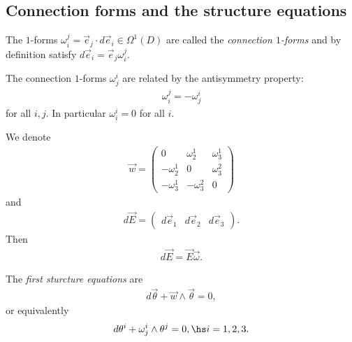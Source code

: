 \documentclass{article}
\begin{document}
\subsection{Connection forms and the structure equations}

\begin{definition}
    The $1$-forms $\omega_i^j=\vec e_j\cdot d\vec e_i\in\Omega^1(D)$ are called the 
    \emph{connection $1$-forms} and by definition satisfy $d\vec e_i = \vec e_j\omega_i^j$.
\end{definition}

\begin{proposition}
    The connection $1$-forms $\omega_j^i$ are related by the antisymmetry property: 
    \begin{align*}
        \omega_i^j = -\omega_j^i
    \end{align*}
    for all $i,j$. In particular $\omega_i^i = 0$ for all $i$.
\end{proposition}

\begin{lemma}
    We denote 
    \begin{align*}
        \vec w = \begin{pmatrix}
            0           & \omega_2^1  & \omega_3^1 \\
            -\omega_2^1 & 0           & \omega_3^2 \\
            -\omega_3^1 & -\omega_3^2 & 0
        \end{pmatrix}
    \end{align*}
    and 
    \begin{align*}
        d\vec E = \begin{pmatrix}
            d\vec e_1 & d\vec e_2 & d\vec e_3
        \end{pmatrix}.
    \end{align*}
    Then 
    \begin{align*}
        d\vec E = \vec E\vec\omega.
    \end{align*}
\end{lemma}

\begin{theorem}
    The \emph{first sturcture equations} are 
    \begin{align*}
        d\vec\theta + \vec w \wedge \vec \theta = 0,
    \end{align*}
    or equivalently 
    \begin{align*}
        d\theta^i + \omega_j^i \wedge \theta^j = 0,\hs i=1,2,3.
    \end{align*}
\end{theorem}
\end{document}
